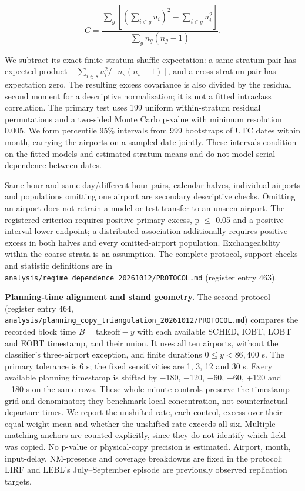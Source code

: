 \documentclass[11pt,a4paper]{article}
\begin{document}
\begin{equation}C = \frac{\sum_g[(\sum_{i\in g}u_i)^2-\sum_{i\in g}u_i^2]}
{\sum_g n_g(n_g-1)}.\end{equation}

We subtract its exact finite-stratum shuffle expectation: a same-stratum pair has expected product \(-\sum_{i\in s}u_i^2/[n_s(n_s-1)]\), and a cross-stratum pair has expectation zero. The resulting excess covariance is also divided by the residual second moment for a descriptive normalisation; it is not a fitted intraclass correlation. The primary test uses 199 uniform within-stratum residual permutations and a two-sided Monte Carlo p-value with minimum resolution 0.005. We form percentile 95\% intervals from 999 bootstraps of UTC dates within month, carrying the airports on a sampled date jointly. These intervals condition on the fitted models and estimated stratum means and do not model serial dependence between dates.

Same-hour and same-day/different-hour pairs, calendar halves, individual airports and populations omitting one airport are secondary descriptive checks. Omitting an airport does not retrain a model or test transfer to an unseen airport. The registered criterion requires positive primary excess, p \(\leq\) 0.05 and a positive interval lower endpoint; a distributed association additionally requires positive excess in both halves and every omitted-airport population. Exchangeability within the coarse strata is an assumption. The complete protocol, support checks and statistic definitions are in \texttt{analysis/\allowbreak{}regime\_\allowbreak{}dependence\_\allowbreak{}20261012/\allowbreak{}PROTOCOL.md} (register entry 463).

\textbf{Planning-time alignment and stand geometry.} The second protocol (register entry 464, \texttt{analysis/\allowbreak{}planning\_\allowbreak{}copy\_\allowbreak{}triangulation\_\allowbreak{}20261012/\allowbreak{}PROTOCOL.md}) compares the recorded block time \(B=\mathrm{takeoff}-y\) with each available SCHED, IOBT, LOBT and EOBT timestamp, and their union. It uses all ten airports, without the classifier's three-airport exception, and finite durations \(0\leq y<86{,}400\) s. The primary tolerance is 6 s; the fixed sensitivities are 1, 3, 12 and 30 s. Every available planning timestamp is shifted by $-$180, $-$120, $-$60, +60, +120 and +180 s on the same rows. These whole-minute controls preserve the timestamp grid and denominator; they benchmark local concentration, not counterfactual departure times. We report the unshifted rate, each control, excess over their equal-weight mean and whether the unshifted rate exceeds all six. Multiple matching anchors are counted explicitly, since they do not identify which field was copied. No p-value or physical-copy precision is estimated. Airport, month, input-delay, NM-presence and coverage breakdowns are fixed in the protocol; LIRF and LEBL's July--September episode are previously observed replication targets.
\end{document}
